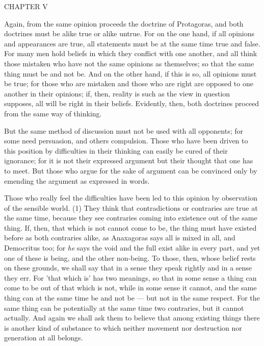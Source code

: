 CHAPTER V

Again, from the same opinion proceeds the doctrine of Protagoras, and both doctrines must be alike true or alike untrue. For on the one hand, if all opinions and appearances are true, all statements must be at the same time true and false. For many men hold beliefs in which they conflict with one another, and all think those mistaken who have not the same opinions as themselves; so that the same thing must be and not be. And on the other hand, if this is so, all opinions must be true; for those who are mistaken and those who are right are opposed to one another in their opinions; if, then, reality is such as the view in question supposes, all will be right in their beliefs. Evidently, then, both doctrines proceed from the same way of thinking.

But the same method of discussion must not be used with all opponents; for some need persuasion, and others compulsion. Those who have been driven to this position by difficulties in their thinking can easily be cured of their ignorance; for it is not their expressed argument but their thought that one has to meet. But those who argue for the sake of argument can be convinced only by emending the argument as expressed in words.

Those who really feel the difficulties have been led to this opinion by observation of the sensible world. (1) They think that contradictions or contraries are true at the same time, because they see contraries coming into existence out of the same thing. If, then, that which is not cannot come to be, the thing must have existed before as both contraries alike, as Anaxagoras says all is mixed in all, and Democritus too; for \emph{he} says the void and the full exist alike in every part, and yet one of these is being, and the other non-being. To those, then, whose belief rests on these grounds, we shall say that in a sense they speak rightly and in a sense they err. For 'that which is' has two meanings, so that in some sense a thing can come to be out of that which is not, while in some sense it cannot, and the same thing can at the same time be and not be — but not in the same respect. For the same thing can be potentially at the same time two contraries, but it cannot actually. And again we shall ask them to believe that among existing things there is another kind of substance to which neither movement nor destruction nor generation at all belongs.

